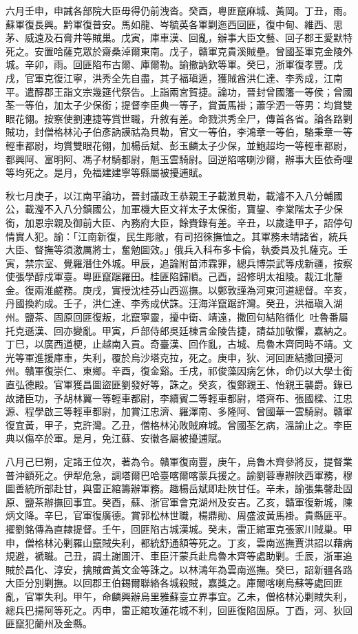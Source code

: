 \begin{pinyinscope}
六月壬申，申誡各部院大臣毋得仍前洩沓。癸酉，粵匪竄麻城、黃岡。丁丑，雨。蘇軍復長興。黔軍復普安。馬如龍、岑毓英各軍剿迤西回匪，復中甸、維西、思茅、威遠及石膏井等賊巢。戊寅，庫車漢、回亂，辦事大臣文藝、回子郡王愛默特死之。安置哈薩克眾於齋桑淖爾東南。戊子，贛軍克貴溪賊壘。曾國荃軍克金陵外城。辛卯，雨。回匪陷布古爾、庫爾勒。諭撤訥欽等軍。癸巳，浙軍復孝豐。戊戌，官軍克復江寧，洪秀全先自盡，其子福瑱遁，獲賊酋洪仁達、李秀成，江南平。遣醇郡王詣文宗幾筵代祭告。上詣兩宮賀捷。論功，晉封曾國籓一等侯；曾國荃一等伯，加太子少保銜；提督李臣典一等子，賞黃馬褂；蕭孚泗一等男：均賞雙眼花翎。按察使劉連捷等賞世職，升敘有差。命戮洪秀全尸，傳首各省。論各路剿賊功，封僧格林沁子伯彥訥謨祜為貝勒，官文一等伯，李鴻章一等伯，駱秉章一等輕車都尉，均賞雙眼花翎，加楊岳斌、彭玉麟太子少保，並鮑超均一等輕車都尉，都興阿、富明阿、馮子材騎都尉，魁玉雲騎尉。回逆陷喀喇沙爾，辦事大臣依奇哩等均死之。是月，免福建建寧等縣屬被擾逋賦。

秋七月庚子，以江南平論功，晉封議政王恭親王子載澂貝勒，載濬不入八分輔國公，載瀅不入八分鎮國公，加軍機大臣文祥太子太保銜，寶鋆、李棠階太子少保銜，加恩宗親及御前大臣、內務府大臣，餘賚錄有差。辛丑，以歲逢甲子，詔停句情實人犯。諭：「江南新復，民生彫敝，有司招徠撫恤之。其軍務未靖諸省，統兵大臣、督撫等須激厲將士，奮勉圖效。」俄兵入科布多卡倫，執委員及扎薩克。壬寅，禁宗室、覺羅潛住外城。甲辰，追論附苗沛霖罪，總兵博崇武等戍新疆，按察使張學醇戍軍臺。粵匪竄踞羅田。桂匪陷歸順。己酉，詔修明太祖陵。裁江北釐金。復兩淮鹺務。庚戌，實授沈桂芬山西巡撫。以鄭敦謹為河東河道總督。辛亥，丹國換約成。壬子，洪仁達、李秀成伏誅。汪海洋竄踞許灣。癸丑，洪福瑱入湖州。鹽茶、固原回匪復叛，北竄寧靈，擾中衛、靖遠，撒回句結陷循化，吐魯番屬托克遜漢、回亦變亂。甲寅，戶部侍郎吳廷棟言金陵告捷，請益加敬懼，嘉納之。丁巳，以廣西道梗，止越南入貢。奇臺漢、回作亂，古城、烏魯木齊同時不靖。文光等軍進援庫車，失利，覆於烏沙塔克拉，死之。庚申，狄、河回匪結撒回擾河州。贛軍復崇仁、東鄉。辛酉，復金谿。壬戌，祁俊藻因病乞休，命仍以大學士銜直弘德殿。官軍獲昌圖盜匪劉發好等，誅之。癸亥，復鄭親王、怡親王襲爵。錄已故諸臣功，予胡林翼一等輕車都尉，李續賓二等輕車都尉，塔齊布、張國樑、江忠源、程學啟三等輕車都尉，加賞江忠濟、羅澤南、多隆阿、曾國華一雲騎尉。贛軍復宜黃，甲子，克許灣。乙丑，僧格林沁敗賊麻城。曾國荃乞病，溫諭止之。李臣典以傷卒於軍。是月，免江蘇、安徽各屬被擾逋賦。

八月己巳朔，定諸王位次，著為令。贛軍復南豐，庚午，烏魯木齊參將反，提督業普沖額死之。伊犁危急，調塔爾巴哈臺喀爾喀蒙兵援之。諭劉蓉專辦陜西軍務，穆圖善統所部赴甘，與雷正綰籌辦軍務。趣楊岳斌即赴陜甘任。辛未，諭張集馨赴固原、鹽茶辦撫回事宜。癸酉，蘇、浙官軍會克湖州及安吉。乙亥，贛軍復新城，陳炳文降。辛巳，官軍復廣德。賞郭松林世職，楊鼎勛、周盛波黃馬褂。貴縣匪平。擢劉銘傳為直隸提督。壬午，回匪陷古城漢城。癸未，雷正綰軍克張家川賊巢。甲申，僧格林沁剿羅山竄賊失利，都統舒通額等死之。丁亥，雲南巡撫賈洪詔以藉病規避，褫職。己丑，調土謝圖汗、車臣汗蒙兵赴烏魯木齊等處助剿。壬辰，浙軍追賊於昌化、淳安，擒賊酋黃文金等誅之。以林鴻年為雲南巡撫。癸巳，詔新疆各路大臣分別剿撫。以回郡王伯錫爾聯絡各城殺賊，嘉獎之。庫爾喀喇烏蘇等處回匪亂，官軍失利。甲午，命麟興辦烏里雅蘇臺立界事宜。乙未，僧格林沁剿賊失利，總兵巴揚阿等死之。丙申，雷正綰攻蓮花城不利，回匪復陷固原。丁酉，河、狄回匪竄犯蘭州及金縣。


\end{pinyinscope}
